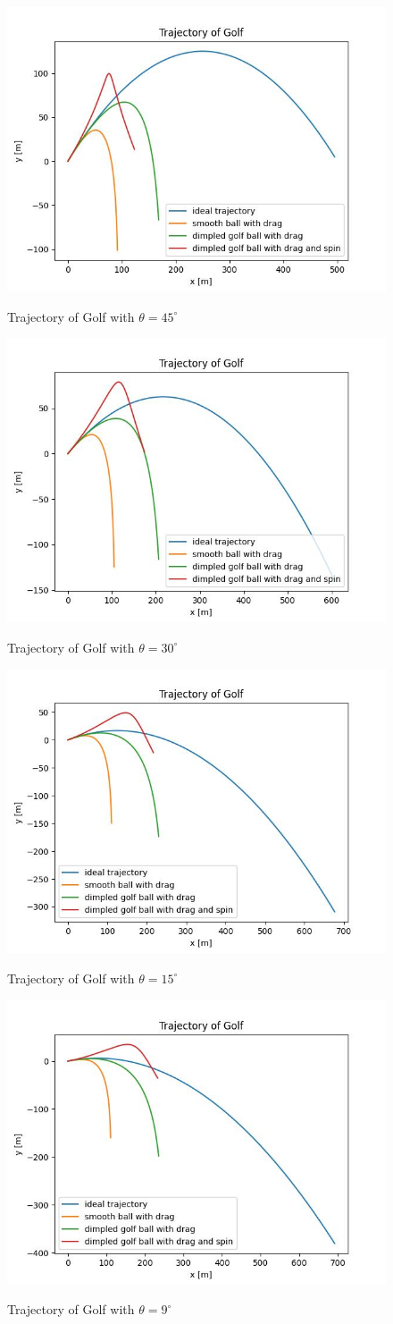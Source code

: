 \documentclass[11pt, oneside]{article}
\begin{document}
\begin{figure}
    \centering
    \includegraphics[width=0.5\linewidth]{Trajectory_of_Golf_with_theta=45.0.jpeg}
    \label{fig:4}
    \caption{Trajectory of Golf with $\theta=45^{\circ}$}
\end{figure}

\begin{figure}
    \centering
    \includegraphics[width=0.5\linewidth]{Trajectory_of_Golf_with_theta=30.0.jpeg}
    \label{fig:5}
    \caption{Trajectory of Golf with $\theta=30^{\circ}$}
\end{figure}

\begin{figure}
    \centering
    \includegraphics[width=0.5\linewidth]{Trajectory_of_Golf_with_theta=15.0.jpeg}
    \label{fig:6}
    \caption{Trajectory of Golf with $\theta=15^{\circ}$}
\end{figure}

\begin{figure}
    \centering
    \includegraphics[width=0.5\linewidth]{Trajectory_of_Golf_with_theta=9.0.jpeg}
    \label{fig:7}
    \caption{Trajectory of Golf with $\theta=9^{\circ}$}
\end{figure}
\end{document}
